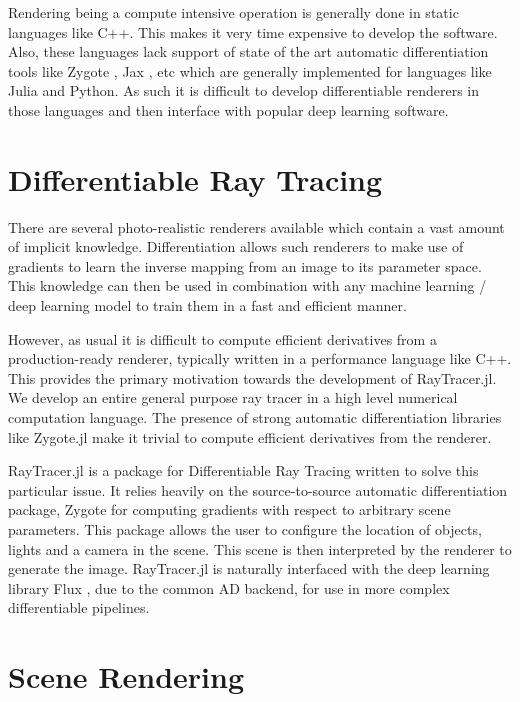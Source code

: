 \documentclass{juliacon}
\begin{document}
Rendering being a compute intensive operation is generally done in static languages like C++. This makes it very time expensive to develop the software. Also, these languages lack support of state of the art automatic differentiation tools like Zygote \cite{DBLP:journals/corr/abs-1810-07951}, Jax \cite{jax}, etc which are generally implemented for languages like Julia and Python. As such it is difficult to develop differentiable renderers in those languages and then interface with popular deep learning software.

\section{Differentiable Ray Tracing}

There are several photo-realistic renderers available which contain a vast amount of implicit knowledge. Differentiation allows such renderers to make use of gradients to learn the inverse mapping from an image to its parameter space. This knowledge can then be used in combination with any machine learning / deep learning model to train them in a fast and efficient manner.

However, as usual it is difficult to compute efficient derivatives from a production-ready renderer, typically written in a performance language like C++. This provides the primary motivation towards the development of RayTracer.jl. We develop an entire general purpose ray tracer in a high level numerical computation language. The presence of strong automatic differentiation libraries like Zygote.jl make it trivial to compute efficient derivatives from the renderer.

RayTracer.jl \cite{RayTracer.jl} is a package for Differentiable Ray Tracing written to solve this particular issue. It relies heavily on the source-to-source automatic differentiation package, Zygote for computing gradients with respect to arbitrary scene parameters. This package allows the user to configure the location of objects, lights and a camera in the scene. This scene is then interpreted by the renderer to generate the image. RayTracer.jl is naturally interfaced with the deep learning library Flux \cite{Flux.jl-2018}, due to the common AD backend, for use in more complex differentiable pipelines.

\section{Scene Rendering}
\end{document}
